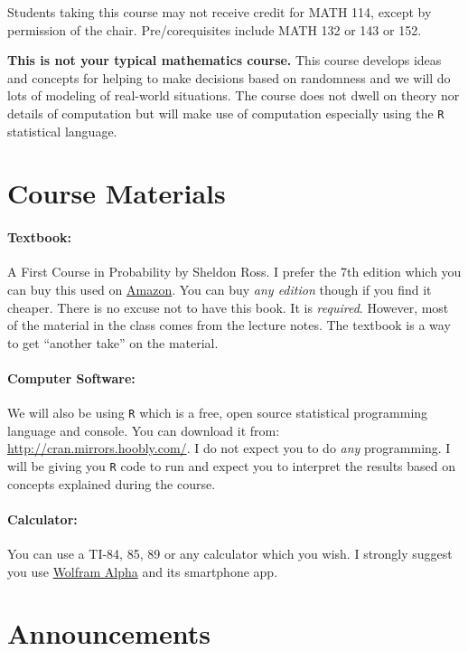 \documentclass[12pt]{article}
\begin{document}
Students taking this course may not receive credit for MATH 114, except by permission of the chair. Pre/corequisites include MATH 132 or 143 or 152.

\textbf{This is not your typical mathematics course.} This course develops ideas and concepts for helping to make decisions based on randomness and we will do lots of modeling of real-world situations. The course does not dwell on theory nor details of computation but will make use of computation especially using the \texttt{R} statistical language.


\section*{Course Materials}

\paragraph{Textbook:} A First Course in Probability by Sheldon Ross. I prefer the 7th edition which you can buy this used on \href{http://www.amazon.com/First-Course-Probability-7th-Edition/dp/0131856626}{Amazon}. You can buy \textit{any edition} though if you find it cheaper. There is no excuse not to have this book. It is \textit{required}. However, most of the material in the class comes from the lecture notes. The textbook is a way to get ``another take'' on the material.

\paragraph{Computer Software:} We will also be using \texttt{R} which is a free, open source statistical programming language and console. You can download it from: \url{http://cran.mirrors.hoobly.com/}. I do not expect you to do \textit{any} programming. I will be giving you \texttt{R} code to run and expect you to interpret the results based on concepts explained during the course.

\paragraph{Calculator:} You can use a TI-84, 85, 89 or any calculator which you wish. I strongly suggest you use \href{http://www.wolframalpha.com/}{Wolfram Alpha} and its smartphone app.

\section*{Announcements}
\end{document}
